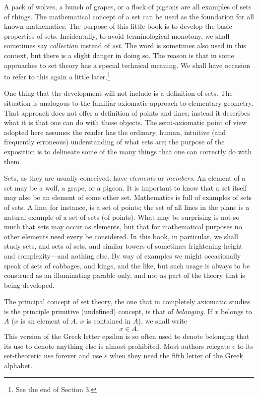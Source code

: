   A pack of wolves, a bunch of grapes, or a flock of pigeons are all examples of sets of things. 
 The mathematical concept of a set can be used as the foundation for all known mathematics. 
 The purpose of this little book is to develop the basic properties of sets. 
 Incidentally, to avoid terminological monotony, we shall sometimes say \textit{collection} instead of \textit{set}. 
 The word  is sometimes also used in this context, but there is a slight danger in doing so. 
 The reason is that in some approaches to set theory  has a special technical meaning. 
 We shall have occasion to refer to this again a little later.\footnote{
     See the end of Section 3. 
   }



 One thing that the development will not include is a definition of sets. 
 The situation is analogous to the familiar axiomatic approach to elementary geometry. 
 That approach does not offer a definition of points and lines; instead it describes what it is that one can do with those objects. 
 The semi-axiomatic point of view adopted here assumes the reader has the ordinary, human, intuitive (and frequently erroneous) understanding of what sets are; the purpose of the exposition is to delineate some of the many things that one can correctly do with them.


  Sets, as they are usually conceived, have \textit{elements} or \textit{members}. 
 An element of a set may be a wolf, a grape, or a pigeon. 
 It is important to know that a set itself may also be an element of some other set. 
 Mathematics is full of examples of sets of sets. 
 A line, for instance, is a set of points; the set of all lines in the plane is a natural example of a set of sets (of points). 
 What may be surprising is not so much that sets may occur as elements, but that for mathematical purposes no other elements need every be considered. 
 In this book, in particular, we shall study sets, and sets of sets, and similar towers of sometimes frightening height and complexity---and nothing else. 
 By way of examples we might occasionally speak of sets of cabbages, and kings, and the like, but such usage is always to be construed as an illuminating parable only, and not as part of the theory that is being developed.


  The principal concept of set theory, the one that in completely axiomatic studies is the principle primitive (undefined) concept, is that of \textit{belonging}. 
 If $x$ belongs to $A$ ($x$ is an element of $A$, $x$ is contained in $A$), we shall write  
\[x \in A.\]    
 This version of the Greek letter epsilon is so often used to denote belonging that its use to denote anything else is almost prohibited. 
 Most authors relegate $\epsilon$ to its set-theoretic use forever and use $\varepsilon$ when they need the fifth letter of the Greek alphabet. 


